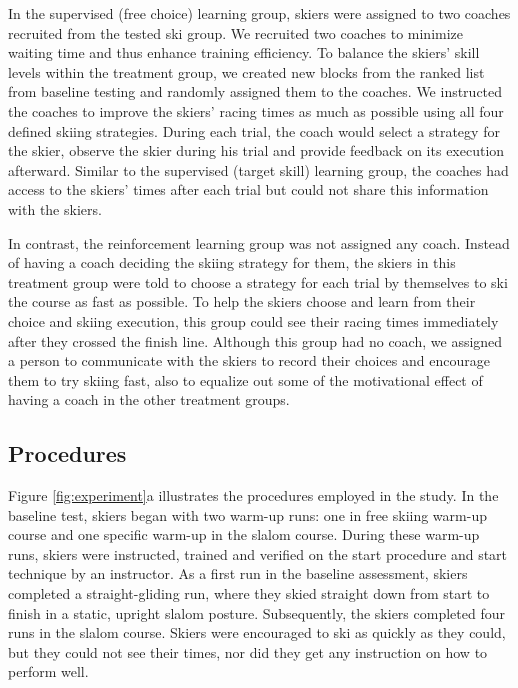 \documentclass[pdflatex,sn-mathphys-num]{sn-jnl}%
\theoremstyle{thmstyleone}%
\theoremstyle{thmstyletwo}%
\theoremstyle{thmstylethree}%
\begin{document}
In the supervised (free choice) learning group, skiers were assigned to two coaches recruited from the tested ski group. We recruited two coaches to minimize waiting time and thus enhance training efficiency. To balance the skiers' skill levels within the treatment group, we created new blocks from the ranked list from baseline testing and randomly assigned them to the coaches. We instructed the coaches to improve the skiers' racing times as much as possible using all four defined skiing strategies. During each trial, the coach would select a strategy for the skier, observe the skier during his trial and provide feedback on its execution afterward. Similar to the supervised (target skill) learning group, the coaches had access to the skiers' times after each trial but could not share this information with the skiers.

In contrast, the reinforcement learning group was not assigned any coach. Instead of having a coach deciding the skiing strategy for them, the skiers in this treatment group were told to choose a strategy for each trial by themselves to ski the course as fast as possible. To help the skiers choose and learn from their choice and skiing execution, this group could see their racing times immediately after they crossed the finish line. Although this group had no coach, we assigned a person to communicate with the skiers to record their choices and encourage them to try skiing fast, also to equalize out some of the motivational effect of having a coach in the other treatment groups. 

\subsection{Procedures}\label{subsec4}
Figure \ref{fig:experiment}a illustrates the procedures employed in the study. 
In the baseline test, skiers began with two warm-up runs: one in free skiing warm-up course and one specific warm-up in the slalom course. During these warm-up runs, skiers were instructed, trained and verified on the start procedure and start technique by an instructor. As a first run in the baseline assessment, skiers completed a straight-gliding run, where they skied straight down from start to finish in a static, upright slalom posture. Subsequently, the skiers completed four runs in the slalom course. Skiers were encouraged to ski as quickly as they could, but they could not see their times, nor did they get any instruction on how to perform well. 
\end{document}
